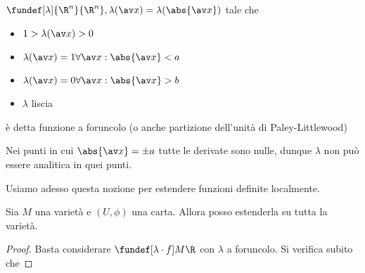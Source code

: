 
\begin{defn}
 $\fundef[\lambda] {\R^n}{\R^n}, \lambda(\av x) = \lambda(\abs{\av x})$ tale che 
 \begin{itemize}
  \item $1 > \lambda(\av x) > 0$
  \item $\lambda(\av x) = 1 \forall \av x: \abs{\av x} < a$
  \item $\lambda(\av x) = 0 \forall \av x: \abs{\av x} > b$
  \item $\lambda$ liscia
 \end{itemize}
 è detta funzione a foruncolo (o anche partizione dell'unità di Paley-Littlewood)
\end{defn}
\begin{oss}
 Nei punti in cui $\abs{\av x} = \pm a$ tutte le derivate sono nulle, dunque $\lambda$ non può essere analitica in quei punti.
\end{oss}
Usiamo adesso questa nozione per estendere funzioni definite localmente.
\begin{prop}
 Sia $M$ una varietà e $(U, \phi)$ una carta. Allora posso estenderla su tutta la varietà.
\end{prop}
 \begin{proof}
  Basta considerare $\fundef[\lambda\cdot f] M\R$ con $\lambda$ a foruncolo. Si verifica subito che 
 \end{proof}
 
